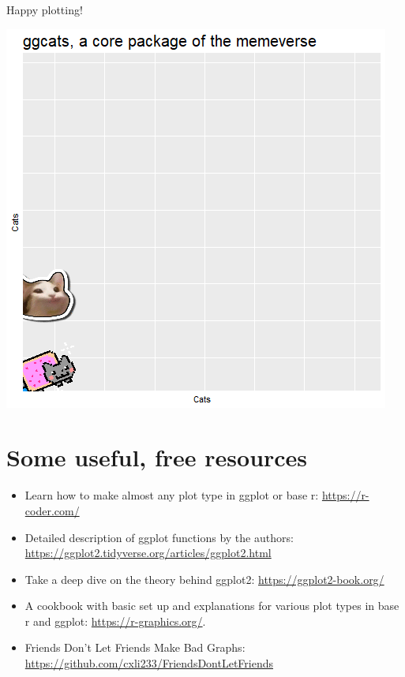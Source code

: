 \documentclass[
  letterpaper,
  DIV=11,
  numbers=noendperiod]{scrreprt}
\providecommand{\tightlist}{%
  \setlength{\itemsep}{0pt}\setlength{\parskip}{0pt}}\usepackage{longtable,booktabs,array}
\begin{document}
Happy plotting!

\includegraphics{scripts/02_dataViz/DataVizDay2_files/ggcats.gif}

\hypertarget{some-useful-free-resources}{%
\section{Some useful, free resources}\label{some-useful-free-resources}}

\begin{itemize}
\tightlist
\item
  Learn how to make almost any plot type in ggplot or base r:
  \url{https://r-coder.com/}
\item
  Detailed description of ggplot functions by the authors:
  \url{https://ggplot2.tidyverse.org/articles/ggplot2.html}
\item
  Take a deep dive on the theory behind ggplot2:
  \url{https://ggplot2-book.org/}
\item
  A cookbook with basic set up and explanations for various plot types
  in base r and ggplot: \url{https://r-graphics.org/}.
\item
  Friends Don't Let Friends Make Bad Graphs:
  \url{https://github.com/cxli233/FriendsDontLetFriends}
\end{itemize}

\end{document}
